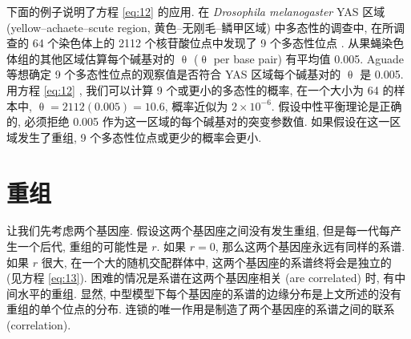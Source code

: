 \documentclass[12pt]{article}
\begin{document}
下面的例子说明了方程 \ref{eq:12} 的应用.
在 \textit{Drosophila melanogaster} YAS 区域 (yellow--achaete--scute region, 黄色--无刚毛--鳞甲区域)
中多态性的调查中, 在所调查的 64 个染色体上的 2112 个核苷酸位点中发现了 9 个多态性位点 \parencite{aguade1989}.
从果蝇染色体组的其他区域估算每个碱基对的 $\uptheta$ ($\uptheta$ per base pair) 有平均值 0.005.
Aguade 等想确定 9 个多态性位点的观察值是否符合 YAS 区域每个碱基对的 $\uptheta$ 是 0.005.
用方程 \ref{eq:12} , 我们可以计算 9 个或更小的多态性的概率, 在一个大小为 64 的样本中,
$\uptheta = 2112(0.005) = 10.6$, 概率近似为 $2 \times 10^{-6}$.
假设中性平衡理论是正确的, 必须拒绝 0.005 作为这一区域的每个碱基对的突变参数值.
如果假设在这一区域发生了重组, 9 个多态性位点或更少的概率会更小.

\section{重组}

让我们先考虑两个基因座. 假设这两个基因座之间没有发生重组, 但是每一代每产生一个后代, 重组的可能性是 $r$.
如果 $r=0$, 那么这两个基因座永远有同样的系谱.
如果 $r$ 很大, 在一个大的随机交配群体中, 这两个基因座的系谱终将会是独立的 (见方程 \ref{eq:13}).
困难的情况是系谱在这两个基因座相关 (are correlated) 时, 有中间水平的重组.
显然, 中型模型下每个基因座的系谱的边缘分布是上文所述的没有重组的单个位点的分布.
连锁的唯一作用是制造了两个基因座的系谱之间的联系 (correlation).
\end{document}
